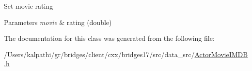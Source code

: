 Set movie rating


\begin{DoxyParams}{Parameters}
{\em movie} & rating (double) \\
\hline
\end{DoxyParams}


The documentation for this class was generated from the following file\+:\begin{DoxyCompactItemize}
\item 
/\+Users/kalpathi/gr/bridges/client/cxx/bridges17/src/data\+\_\+src/\mbox{\hyperlink{_actor_movie_i_m_d_b_8h}{Actor\+Movie\+I\+M\+D\+B.\+h}}\end{DoxyCompactItemize}
